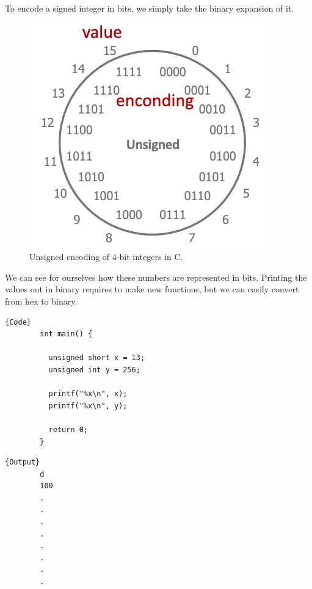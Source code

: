 \documentclass{article}
\begin{document}
    \begin{theorem}
      To encode a signed integer in bits, we simply take the binary expansion of it. 
      \begin{figure}[H]
        \centering 
        \includegraphics[scale=0.4]{img/unsigned_encoding.png}
        \caption{Unsigned encoding of 4-bit integers in C. } 
        \label{fig:unsigned_encoding}
      \end{figure}
    \end{theorem}

    \begin{example}
      We can see for ourselves how these numbers are represented in bits. Printing the values out in binary requires to make new functions, but we can easily convert from hex to binary. 

      \noindent\begin{minipage}{.5\textwidth}
      \begin{lstlisting}[]{Code}
        int main() { 

          unsigned short x = 13; 
          unsigned int y = 256;

          printf("%x\n", x);
          printf("%x\n", y);

          return 0; 
        }
      \end{lstlisting}
      \end{minipage}
      \hfill
      \begin{minipage}{.49\textwidth}
      \begin{lstlisting}[]{Output}
        d
        100 
        .
        .
        .
        .
        .
        .
        .
        .
      \end{lstlisting}
      \end{minipage}
    \end{example}
\end{document}
